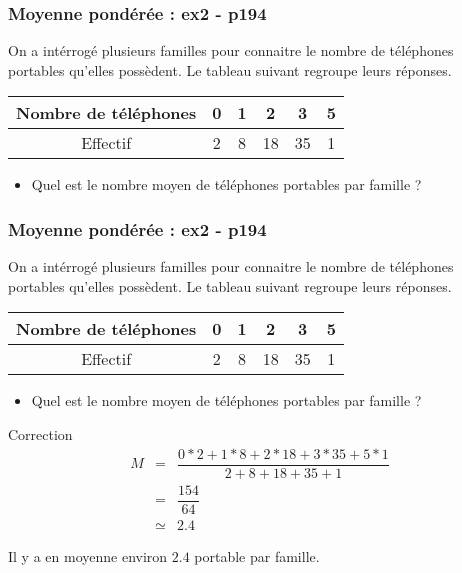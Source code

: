 \documentclass{beamer}
\begin{document}
\begin{frame}
  \frametitle{Moyenne pondérée : ex2 - p194}

  On a intérrogé plusieurs familles pour connaitre le nombre de téléphones portables qu'elles possèdent. Le tableau suivant regroupe leurs réponses.
  
  \begin{center}
    \begin{tabular}{| c   || c | c | c  | c  | c |}
      \hline
      Nombre de téléphones & 0 & 1 &  2 &  3 & 5 \\
      \hline
      Effectif             & 2 & 8 & 18 & 35 & 1 \\
      \hline
    \end{tabular}
  \end{center}
  
  \begin{itemize}
  \item Quel est le nombre moyen de téléphones portables par famille ?
  \end{itemize}

\end{frame}

\begin{frame}
  \frametitle{Moyenne pondérée : ex2 - p194}

  On a intérrogé plusieurs familles pour connaitre le nombre de téléphones portables qu'elles possèdent. Le tableau suivant regroupe leurs réponses.
  
  \begin{center}
    \begin{tabular}{| c   || c | c | c  | c  | c |}
      \hline
      Nombre de téléphones & 0 & 1 &  2 &  3 & 5 \\
      \hline
      Effectif             & 2 & 8 & 18 & 35 & 1 \\
      \hline
    \end{tabular}
  \end{center}
  
  \begin{itemize}
  \item Quel est le nombre moyen de téléphones portables par famille ?
  \end{itemize}
  
  \begin{exampleblock}{Correction}
    \begin{eqnarray*}
      M &=     & \dfrac{0*2+1*8+2*18+3*35+5*1}{2+8+18+35+1}\\
      &=     & \dfrac{154}{64}\\
      &\simeq& 2.4
    \end{eqnarray*}
    
    Il y a en moyenne environ $2.4$ portable par famille. 
  \end{exampleblock}
  
\end{frame}
\end{document}
